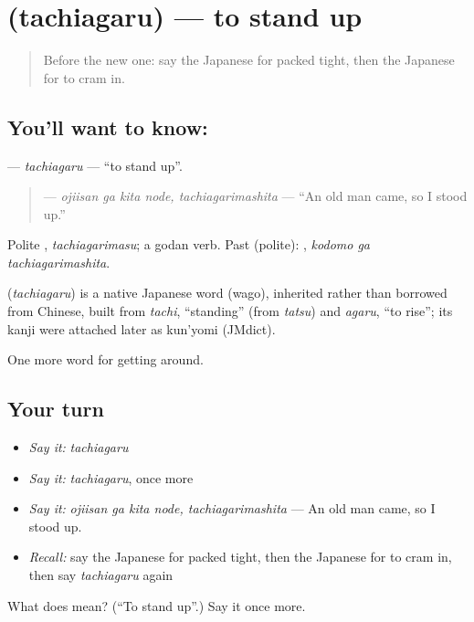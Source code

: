 \section[\texorpdfstring{\ja{たちあがる} (tachiagaru)}{たちあがる (tachiagaru)}]{ (tachiagaru) — to stand up}

\label{lesson:JA-C378-tachiagaru}



\begin{quote}
Before the new one: say the Japanese for packed tight, then the Japanese for to cram in.
\end{quote}

\subsection*{You'll want to know: }
\textbf{} — \emph{tachiagaru} — \textquotedblleft{}to stand up\textquotedblright{}.

\begin{quote}
\textbf{ } — \emph{ojiisan ga kita node, tachiagarimashita} — \textquotedblleft{}An old man came, so I stood up.\textquotedblright{}
\end{quote}

Polite \textbf{}, \emph{tachiagarimasu}; a godan verb. Past (polite): \textbf{ }, \emph{kodomo ga tachiagarimashita}.

\begin{cousinweb}
\textbf{} (\emph{tachiagaru}) is a native Japanese word (wago), inherited rather than borrowed from Chinese, built from \emph{tachi}, \textquotedblleft{}standing\textquotedblright{} (from \emph{tatsu}) and \emph{agaru}, \textquotedblleft{}to rise\textquotedblright{}; its kanji were attached later as kun'yomi (JMdict).
\end{cousinweb}

\begin{grammarlens}[title={What you've built}]
One more word for getting around.
\end{grammarlens}

\subsection*{Your turn}
\begin{itemize}
\raggedright
  \item \emph{Say it:} \emph{tachiagaru}
  \item \emph{Say it:} \emph{tachiagaru}, once more
  \item \emph{Say it:} \emph{ojiisan ga kita node, tachiagarimashita} — An old man came, so I stood up.
  \item \emph{Recall:} say the Japanese for packed tight, then the Japanese for to cram in, then say \emph{tachiagaru} again
\end{itemize}

\begin{tcolorbox}[breakable,colback=teal!4,colframe=teal!35!black,title={Before you move on}]
What does  mean? (\textquotedblleft{}To stand up\textquotedblright{}.) Say it once more.
\end{tcolorbox}
